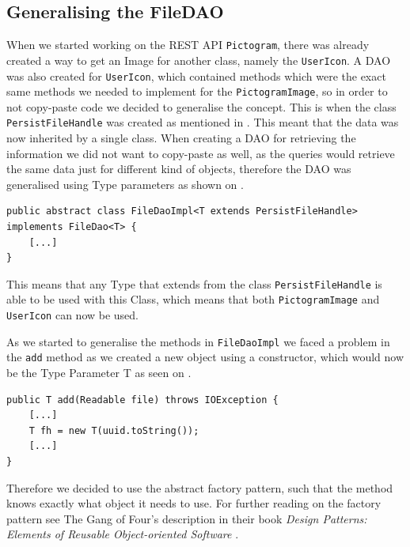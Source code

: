 \subsection{Generalising the FileDAO}\label{subsec:persistfilehandle}
When we started working on the REST API \texttt{Pictogram}, there was already created a way to get an Image for another class, namely the \texttt{UserIcon}.
A DAO was also created for \texttt{UserIcon}, which contained methods which were the exact same methods we needed to implement for the \texttt{PictogramImage}, so in order to not copy-paste code we decided to generalise the concept.
This is when the class \texttt{PersistFileHandle} was created as mentioned in .
This meant that the data was now inherited by a single class.
When creating a DAO for retrieving the information we did not want to copy-paste as well, as the queries would retrieve the same data just for different kind of objects, therefore the DAO was generalised using Type parameters as shown on .


\begin{lstlisting}[float, floatplacement=h, caption={The \texttt{FileDaoImpl} class header which uses Type Parameters to generalise which types it can be used with. \texttt{[...]} denotes omitted code.},label={lst:typeparameter}]
public abstract class FileDaoImpl<T extends PersistFileHandle> implements FileDao<T> {
	[...]
}
\end{lstlisting}

This means that any Type that extends from the class \texttt{PersistFileHandle} is able to be used with this Class, which means that both \texttt{PictogramImage} and \texttt{UserIcon} can now be used.

As we started to generalise the methods in \texttt{FileDaoImpl} we faced a problem in the \texttt{add} method as we created a new object using a constructor, which would now be the Type Parameter T as seen on .

\begin{lstlisting}[float, floatplacement=h, caption={Trying to use a Type Parameter constructor, which Java cannot do. \texttt{[...]} denotes omitted code.},label={lst:TypeParameterConstructor}]
public T add(Readable file) throws IOException {
    [...]
    T fh = new T(uuid.toString());
    [...]
}
\end{lstlisting}

Therefore we decided to use the abstract factory pattern, such that the method knows exactly what object it needs to use.
For further reading on the factory pattern see The Gang of Four's description in their book \textit{Design Patterns: Elements of Reusable Object-oriented Software} \cite{abstractfactorypattern}.

